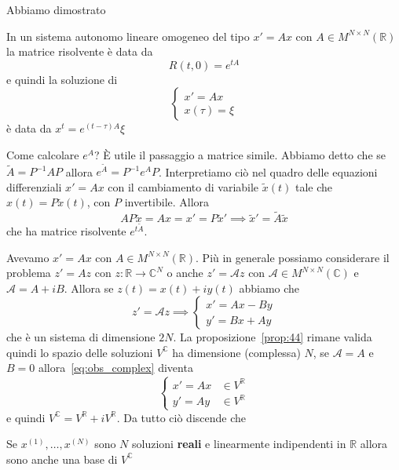 Abbiamo dimostrato
\begin{theorem}
    In un sistema autonomo lineare omogeneo del tipo \(x' = Ax\) con \(A \in
    M^{N \times N}{(\mathbb{R})}\) la matrice risolvente è data da
    \[
        R{(t, 0)} = e^{tA}
    \]
    e quindi la soluzione di 
    \[
      \begin{cases}
          x' = Ax \\
          x{(\tau)} = \xi
      \end{cases}
    \]
    è data da \(x^{t} = e^{(t-\tau)A}\xi\) 
\end{theorem}

Come calcolare \(e^{A}\)? È utile il passaggio a matrice simile. Abbiamo detto
che se \(\tilde{A} = P^{-1}AP\) allora \(e^{\tilde{A}} = P^{-1}e^{A}P\).
Interpretiamo ciò nel quadro delle equazioni differenziali \(x'= Ax\) con il
cambiamento di variabile \(\tilde{x}{(t)}\) tale che \(x {(t)} =
P\tilde{x}{(t)}\), con \(P\) invertibile. Allora
\[
  AP\tilde{x} = Ax = x' = P\tilde{x}' \implies \tilde{x}' = \tilde{A}\tilde{x}
\]
che ha matrice risolvente \(e^{t\tilde{A}}\). 
\begin{remark}
    Avevamo \(x'=Ax\) con \(A \in M^{N \times N}{(\mathbb{R})}\). Più in
    generale possiamo considerare il problema \(z' = Az\) con \(z :
    \mathbb{R}\to \mathbb{C}^{N}\) o anche \(z' = \mathcal{A}z\) con
    \(\mathcal{A} \in M^{N \times N}{(\mathbb{C})}\) e \(\mathcal{A} = A + iB\).
    Allora se \(z {(t)} = x {(t)} + iy {(t)}\) abbiamo che
    \begin{equation}\label{eq:obs_complex}
      z'= \mathcal{A}z \implies \begin{cases}
          x' = Ax - By \\
          y' = Bx + Ay
      \end{cases}
    \end{equation}
    che è un sistema di dimensione \(2N\). La proposizione~\ref{prop:44} rimane
    valida quindi lo spazio delle soluzioni \(V^{\mathbb{C}}\) ha dimensione
    (complessa) \(N\), se \(\mathcal{A} = A\) e \(B = 0\)
    allora~\eqref{eq:obs_complex} diventa 
    \[
      \begin{cases}
          x' = Ax & \in V^{\mathbb{R}}\\
          y' = Ay & \in V^{\mathbb{R}}
      \end{cases}
    \]
    e quindi \(V^{\mathbb{C}} = V^{\mathbb{R}} + iV^{\mathbb{R}}\). Da tutto ciò
    discende che
    \begin{proposition}
        Se \(x^{{(1)}}, \dots, x^{{(N)}}\) sono \(N\) soluzioni \textbf{reali} e
        linearmente indipendenti in \(\mathbb{R}\) allora sono anche una base di
        \(V^{\mathbb{C}}\) 
    \end{proposition}
\end{remark}

